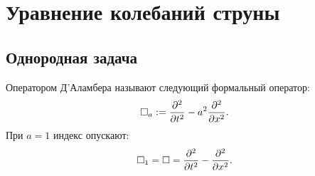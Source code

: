 \newpage
\section{Уравнение колебаний струны}
\subsection{Однородная задача}
    \begin{Def}
        Оператором Д'Аламбера называют следующий формальный оператор:
        \begin{equation*}
            \Box_a := \frac{\partial^2}{\partial{t}^2} - a^2\frac{\partial^2}{\partial{x}^2}.
        \end{equation*}
        При $a = 1$ индекс опускают:
        \begin{equation*}
            \Box_1 = \Box = \frac{\partial^2}{\partial{t}^2} - \frac{\partial^2}{\partial{x}^2}.
        \end{equation*}
    \end{Def}

